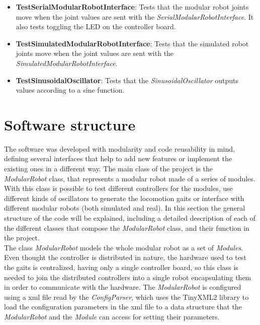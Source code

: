 \begin{itemize}
	\item \textbf{TestSerialModularRobotInterface}: Tests that the modular robot joints move when the joint values are sent with the \emph{SerialModularRobotInterface}. It also tests toggling the LED on the controller board.

	\item \textbf{TestSimulatedModularRobotInterface}: Tests that the simulated robot joints move when the joint values are sent with the \emph{SimulatedModularRobotInterface}.
		
	\item \textbf{TestSinusoidalOscillator}: Tests that the \emph{SinusoidalOscillator} outputs values according to a sine function.
	
\end{itemize}

\section{Software structure}
\label{software_structured}

The software was developed with modularity and code reusability in mind, defining several interfaces that help to add new features or implement the existing ones in a different way. The main class of the project is the \emph{ModularRobot} class, that represents a modular robot made of a series of modules. With this class is possible to test different controllers for the modules, use different kinds of oscillators to generate the locomotion gaits or interface with different modular robots (both simulated and real). In this section the general structure of the code will be explained, including a detailed description of each of the different classes that compose the \emph{ModularRobot} class, and their function in the project.\\


The class \emph{ModularRobot} models the whole modular robot as a set of \emph{Modules}. Even thought the controller is distributed in nature, the hardware used to test the gaits is centralized, having only a single controller board, so this class is needed to join the distributed controllers into a single robot encapsulating them in order to communicate with the hardware. The \emph{ModularRobot} is configured using a xml file read by the \emph{ConfigParser}, which uses the TinyXML2 library to load the configuration parameters in the xml file to a data structure that the \emph{ModularRobot} and the \emph{Module} can access for setting their parameters.\\

